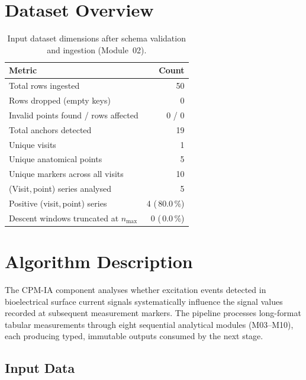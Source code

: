 \documentclass[a4paper,11pt]{article}
\begin{document}
\section{Dataset Overview}

\begin{table}[h!]
\centering
\small
\caption{Input dataset dimensions after schema validation and ingestion (Module~02).}
\begin{tabular}{lr}
\toprule
\textbf{Metric} & \textbf{Count} \\
\midrule
Total rows ingested                        & 50 \\
Rows dropped (empty keys)                  & 0 \\
Invalid points found / rows affected       & 0 / 0 \\
Total anchors detected                     & 19 \\
Unique visits                          & 1 \\
Unique anatomical points               & 5 \\
Unique markers across all visits       & 10 \\
(Visit,\,point) series analysed        & 5 \\
Positive (visit,\,point) series        & 4 (\,80.0\,\%) \\
Descent windows truncated at $n_{\max}$ & 0 (\,0.0\,\%) \\
\bottomrule
\end{tabular}
\end{table}

\section{Algorithm Description}

The CPM-IA component analyses whether excitation events detected in bioelectrical surface
current signals systematically influence the signal values recorded at subsequent measurement
markers. The pipeline processes long-format tabular measurements through eight sequential
analytical modules (M03--M10), each producing typed, immutable outputs consumed by the next
stage.

\subsection{Input Data}
\end{document}

